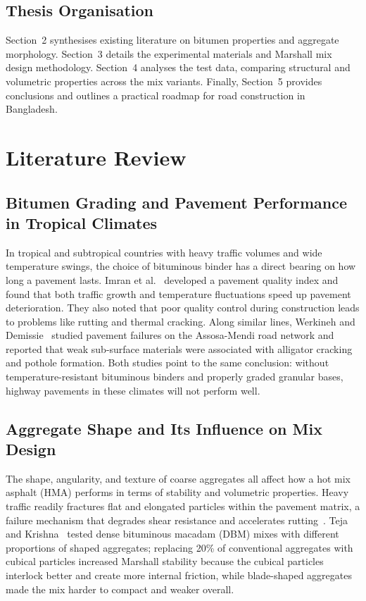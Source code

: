\documentclass[12pt,a4paper]{article}
\begin{document}
\subsection{Thesis Organisation}

Section~2 synthesises existing literature on bitumen properties and aggregate morphology. Section~3 details the experimental materials and Marshall mix design methodology. Section~4 analyses the test data, comparing structural and volumetric properties across the mix variants. Finally, Section~5 provides conclusions and outlines a practical roadmap for road construction in Bangladesh.



\section{Literature Review}

\subsection{Bitumen Grading and Pavement Performance in Tropical Climates}
In tropical and subtropical countries with heavy traffic volumes and wide temperature swings, the choice of bituminous binder has a direct bearing on how long a pavement lasts. Imran et al.~\cite{imran2025developing} developed a pavement quality index and found that both traffic growth and temperature fluctuations speed up pavement deterioration. They also noted that poor quality control during construction leads to problems like rutting and thermal cracking. Along similar lines, Werkineh and Demissie~\cite{werkineh2020assessment} studied pavement failures on the Assosa-Mendi road network and reported that weak sub-surface materials were associated with alligator cracking and pothole formation. Both studies point to the same conclusion: without temperature-resistant bituminous binders and properly graded granular bases, highway pavements in these climates will not perform well.

\subsection{Aggregate Shape and Its Influence on Mix Design}
The shape, angularity, and texture of coarse aggregates all affect how a hot mix asphalt (HMA) performs in terms of stability and volumetric properties. Heavy traffic readily fractures flat and elongated particles within the pavement matrix, a failure mechanism that degrades shear resistance and accelerates rutting~\cite{khairandish2020influence}. Teja and Krishna~\cite{teja2020effect} tested dense bituminous macadam (DBM) mixes with different proportions of shaped aggregates; replacing 20\% of conventional aggregates with cubical particles increased Marshall stability because the cubical particles interlock better and create more internal friction, while blade-shaped aggregates made the mix harder to compact and weaker overall.
\end{document}
